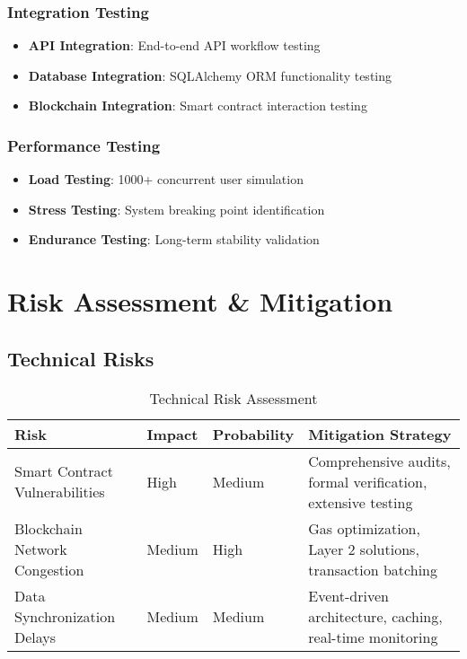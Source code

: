 \documentclass[12pt,a4paper]{article}
\begin{document}
\subsubsection{Integration Testing}
\begin{itemize}
    \item \textbf{API Integration}: End-to-end API workflow testing
    \item \textbf{Database Integration}: SQLAlchemy ORM functionality testing
    \item \textbf{Blockchain Integration}: Smart contract interaction testing
\end{itemize}

\subsubsection{Performance Testing}
\begin{itemize}
    \item \textbf{Load Testing}: 1000+ concurrent user simulation
    \item \textbf{Stress Testing}: System breaking point identification
    \item \textbf{Endurance Testing}: Long-term stability validation
\end{itemize}

\section{Risk Assessment \& Mitigation}

\subsection{Technical Risks}

\begin{table}[H]
\centering
\begin{tabular}{|p{3cm}|p{2cm}|p{2cm}|p{6cm}|}
\hline
\textbf{Risk} & \textbf{Impact} & \textbf{Probability} & \textbf{Mitigation Strategy} \\
\hline
Smart Contract Vulnerabilities & High & Medium & Comprehensive audits, formal verification, extensive testing \\
\hline
Blockchain Network Congestion & Medium & High & Gas optimization, Layer 2 solutions, transaction batching \\
\hline
Data Synchronization Delays & Medium & Medium & Event-driven architecture, caching, real-time monitoring \\
\hline
\end{tabular}
\caption{Technical Risk Assessment}
\end{table}
\end{document}
